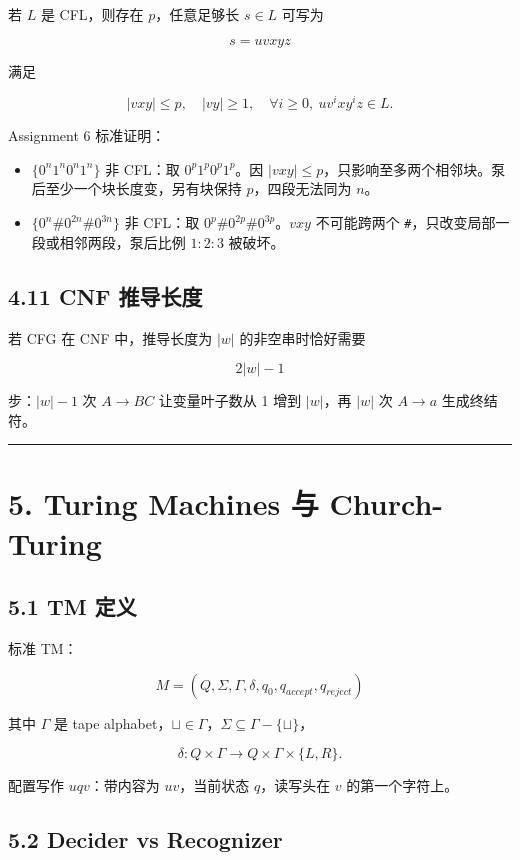 ﻿\documentclass[UTF8,11pt]{ctexart}
\begin{document}
若 \(L\) 是 CFL，则存在 \(p\)，任意足够长 \(s\in L\) 可写为

\[
s=uvxyz
\]

满足

\[
|vxy|\le p,\quad |vy|\ge1,\quad \forall i\ge0,\ uv^ixy^iz\in L.
\]


Assignment 6 标准证明：


\begin{itemize}
\item \(\{0^n1^n0^n1^n\}\) 非 CFL：取 \(0^p1^p0^p1^p\)。因 \(|vxy|\le p\)，只影响至多两个相邻块。泵后至少一个块长度变，另有块保持 \(p\)，四段无法同为 \(n\)。
\item \(\{0^n\#0^{2n}\#0^{3n}\}\) 非 CFL：取 \(0^p\#0^{2p}\#0^{3p}\)。\(vxy\) 不可能跨两个 \texttt{\#}，只改变局部一段或相邻两段，泵后比例 \(1:2:3\) 被破坏。
\end{itemize}


\subsection{4.11 CNF 推导长度}


若 CFG 在 CNF 中，推导长度为 \(|w|\) 的非空串时恰好需要

\[
2|w|-1
\]

步：\(|w|-1\) 次 \(A\to BC\) 让变量叶子数从 1 增到 \(|w|\)，再 \(|w|\) 次 \(A\to a\) 生成终结符。


\bigskip\hrule\bigskip


\section{5. Turing Machines 与 Church-Turing}


\subsection{5.1 TM 定义}


标准 TM：

\[
M=(Q,\Sigma,\Gamma,\delta,q_0,q_{accept},q_{reject})
\]

其中 \(\Gamma\) 是 tape alphabet，\(\sqcup\in\Gamma\)，\(\Sigma\subseteq\Gamma-\{\sqcup\}\)，

\[
\delta:Q\times\Gamma\to Q\times\Gamma\times\{L,R\}.
\]


配置写作 \(uqv\)：带内容为 \(uv\)，当前状态 \(q\)，读写头在 \(v\) 的第一个字符上。


\subsection{5.2 Decider vs Recognizer}
\end{document}
